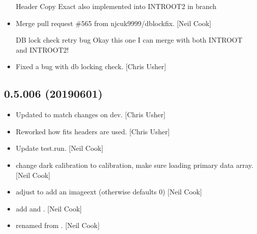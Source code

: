\documentclass[a4paper,10pt,english]{report}
\begin{document}
\begin{itemize}
Header Copy Exact \textendash{} also implemented into INTROOT2 in  branch

\item {} 
Merge pull request \#565 from njcuk9999/db\sphinxhyphen{}lock\sphinxhyphen{}fix. {[}Neil Cook{]}

DB lock check retry bug \sphinxhyphen{} Okay this one I can merge with both INTROOT and INTROOT2!

\item {} 
Fixed a bug with db locking check. {[}Chris Usher{]}

\end{itemize}


\subsection{0.5.006 (2019\sphinxhyphen{}06\sphinxhyphen{}01)}
\label{\detokenize{misc/changelog:id150}}\begin{itemize}
\item {} 
Updated to match changes on dev. {[}Chris Usher{]}

\item {} 
Reworked how fits headers are used. {[}Chris Usher{]}

\item {} 
Update test.run. {[}Neil Cook{]}

\item {} 
 \sphinxhyphen{} change dark calibration to  calibration,
make sure  loading primary data array. {[}Neil Cook{]}

\item {} 
 \sphinxhyphen{} adjust  to add an imageext (otherwise
defaults 0) {[}Neil Cook{]}

\item {} 
 \sphinxhyphen{} add  and . {[}Neil
Cook{]}

\item {} 
 \sphinxhyphen{} renamed from . {[}Neil
Cook{]}

\end{itemize}
\end{document}
